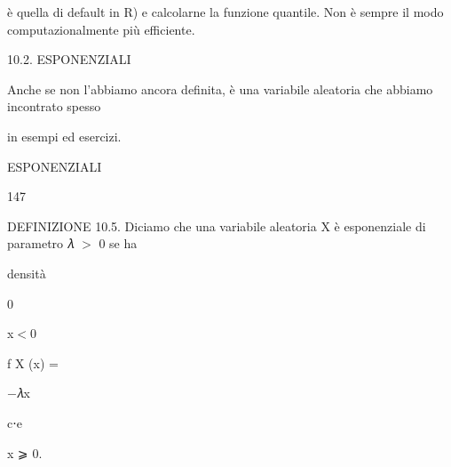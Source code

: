 \documentclass[a4paper,portrait,12pt]{article}
\begin{document}
\begin{flushleft}
\`{e} quella di default in R) e calcolarne la funzione quantile. Non \`{e} sempre il modo computazionalmente più efficiente.
\end{flushleft}





\begin{flushleft}
10.2. ESPONENZIALI
\end{flushleft}


\begin{flushleft}
Anche se non l'abbiamo ancora definita, \`{e} una variabile aleatoria che abbiamo incontrato spesso
\end{flushleft}


\begin{flushleft}
in esempi ed esercizi.
\end{flushleft}





\begin{flushleft}
 ESPONENZIALI
\end{flushleft}





147





\begin{flushleft}
DEFINIZIONE 10.5. Diciamo che una variabile aleatoria X \`{e} esponenziale di parametro 𝜆 $>$ 0 se ha
\end{flushleft}


\begin{flushleft}
densit\`{a}
\end{flushleft}


0


\begin{flushleft}
x$<$0
\end{flushleft}


\begin{flushleft}
f X (x) =
\end{flushleft}


\begin{flushleft}
$-$𝜆x
\end{flushleft}


\begin{flushleft}
c⋅e
\end{flushleft}


\begin{flushleft}
x ⩾ 0.
\end{flushleft}
\end{document}
